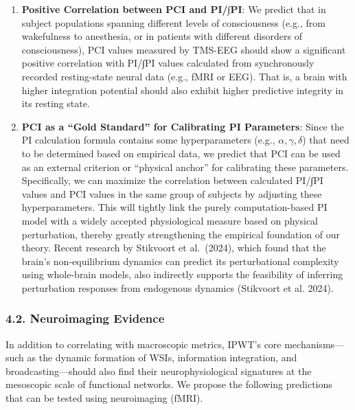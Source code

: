 \documentclass[
  a4paper]{article}
\providecommand{\tightlist}{%
  \setlength{\itemsep}{0pt}\setlength{\parskip}{0pt}}
\begin{document}
\begin{enumerate}
\def\labelenumi{\arabic{enumi}.}
\tightlist
\item
  \textbf{Positive Correlation between PCI and PI/∫PI}: We predict that
  in subject populations spanning different levels of consciousness
  (e.g., from wakefulness to anesthesia, or in patients with different
  disorders of consciousness), PCI values measured by TMS-EEG should
  show a significant positive correlation with PI/∫PI values calculated
  from synchronously recorded resting-state neural data (e.g., fMRI or
  EEG). That is, a brain with higher integration potential should also
  exhibit higher predictive integrity in its resting state.
\item
  \textbf{PCI as a ``Gold Standard'' for Calibrating PI Parameters}:
  Since the PI calculation formula contains some hyperparameters (e.g.,
  \(\alpha, \gamma, \delta\)) that need to be determined based on
  empirical data, we predict that PCI can be used as an external
  criterion or ``physical anchor'' for calibrating these parameters.
  Specifically, we can maximize the correlation between calculated
  PI/∫PI values and PCI values in the same group of subjects by
  adjusting these hyperparameters. This will tightly link the purely
  computation-based PI model with a widely accepted physiological
  measure based on physical perturbation, thereby greatly strengthening
  the empirical foundation of our theory. Recent research by Stikvoort
  et al.~(2024), which found that the brain's non-equilibrium dynamics
  can predict its perturbational complexity using whole-brain models,
  also indirectly supports the feasibility of inferring perturbation
  responses from endogenous dynamics (Stikvoort et al. 2024).
\end{enumerate}

\subsubsection{4.2. Neuroimaging Evidence}\label{neuroimaging-evidence}

In addition to correlating with macroscopic metrics, IPWT's core
mechanisms---such as the dynamic formation of WSIs, information
integration, and broadcasting---should also find their
neurophysiological signatures at the mesoscopic scale of functional
networks. We propose the following predictions that can be tested using
neuroimaging (fMRI).
\end{document}

